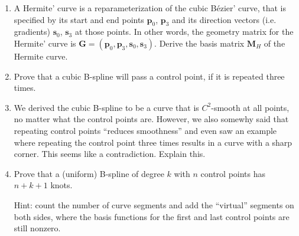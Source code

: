 \documentclass{article}
\newcommand{\bs}{\mathbf{s}}
\newcommand{\bp}{\mathbf{p}}
\newcommand{\bM}{\mathbf{M}}
\newcommand{\bG}{\mathbf{G}}
\newcommand{\Bezier}{B\'{e}zier}
\begin{document}
\begin{enumerate}
\item A Hermite' curve is a reparameterization of the cubic \Bezier' curve, that is specified by its start and end points $\bp_0$, $\bp_3$ and its direction vectors (i.e. gradients) $\bs_0$, $\bs_3$ at those points. In other words, the geometry matrix for the Hermite' curve is $\bG=(\bp_0, \bp_3, \bs_0, \bs_3)$. Derive the basis matrix $\bM_H$ of the Hermite curve.

\item Prove that a cubic B-spline will pass a control point, if it is repeated three times.

\item We derived the cubic B-spline to be a curve that is $C^2$-smooth at all points, no matter what the control points are. However, we also somewhy said that repeating control points ``reduces smoothness'' and even saw an example where repeating the control point three times results in a curve with a sharp corner. This seems like a contradiction. Explain this.

\item Prove that a (uniform) B-spline of degree $k$ with $n$ control points has $n+k+1$ knots. 

Hint: count the number of curve segments and add the ``virtual'' segments on both sides, where the basis functions for the first and last control points are still nonzero.
\end{enumerate}
\end{document}
